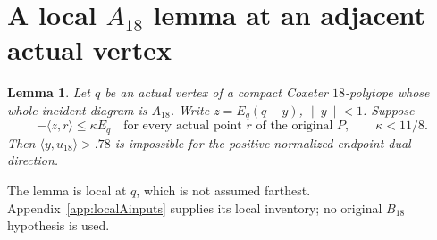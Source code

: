 \documentclass[11pt]{article}
\newtheorem{lemma}[theorem]{Lemma}
\theoremstyle{definition}
\theoremstyle{remark}
\newcommand{\ip}[2]{\langle #1,#2\rangle}
\newcommand{\norm}[1]{\lVert #1\rVert}
\begin{document}
\section[A local A18 lemma at an adjacent actual vertex]{A local \(A_{18}\) lemma at an adjacent actual vertex}
\label{sec:localA18}
\begin{lemma}
\label{lem:localA18}
Let \(q\) be an actual vertex of a compact Coxeter
\(18\)-polytope whose whole incident diagram is \(A_{18}\).
Write \(z=E_q(q-y)\), \(\norm{y}<1\). Suppose
\[
 -\ip{z}{r}\leq\kappa E_q
 \quad\text{for every actual point }r\text{ of the original }P,
 \qquad\kappa<11/8.
\]
Then \(\ip{y}{u_{18}}>.78\) is impossible for the positive
normalized endpoint-dual direction.
\end{lemma}
The lemma is local at \(q\), which is not assumed farthest.
Appendix~\ref{app:localAinputs} supplies its local inventory; no
original \(B_{18}\) hypothesis is used.
\end{document}

